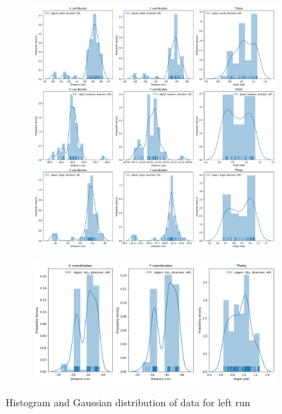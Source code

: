 \documentclass[10pt,a4paper]{article}
\begin{document}
					\begin{figure}[H]
						\begin{subfigure}{\textwidth}
							\centering
							\includegraphics[width=\linewidth]{img/left_hist.png}						
						\end{subfigure}
						\begin{subfigure}{\textwidth}
							\centering
							\includegraphics[width=\linewidth]{img/left_hist_combined.png}				
						\end{subfigure}
						\caption{Histogram and Gaussian distribution of data for left run}
					\end{figure}
\end{document}
